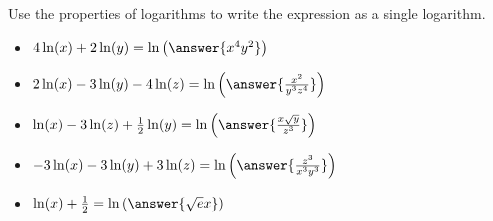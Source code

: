\documentclass{ximera}
\author{Carl Stitz \and Jeff Zeager \and Bart Snapp \and Matthew Carr}
\begin{document}
\begin{exercise}
Use the properties of logarithms to write the expression as a single
logarithm. 

\begin{itemize}
\item $4\ln(x) + 2\ln(y)=\ln\left(\answer{x^4y^2}\right)$ 
\item $2 \ln(x) -3 \ln(y) - 4\ln(z)=\ln\left(\answer{\frac{x^2}{y^3z^4}}\right)$
\item $\ln(x) - 3 \ln(z) + \frac{1}{2} \ln(y)=\ln\left(\answer{\frac{x\sqrt{y}}{z^{3}}}\right)$
\item $-3\ln(x) -3\ln(y) + 3 \ln(z)=\ln\left(\answer{\frac{z^{3}}{x^{3} y^{3}}}\right)$
\item $\ln(x) + \frac{1}{2}=\ln\left(\answer{\sqrt{e}x}\right)$  
\end{itemize}

\end{exercise}
\end{document}
